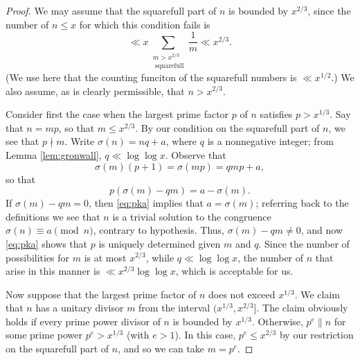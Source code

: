 \documentclass[12pt]{amsart}
\begin{document}
\begin{proof} We may assume that the squarefull part of $n$ is bounded by $x^{2/3}$, since the number of $n \leq x$ for which this condition fails is 
	\[ \ll x \sum_{\substack{m > x^{2/3}\\\text{ squarefull}}} \frac{1}{m} \ll x^{2/3}.\]
(We use here that the counting funciton of the squarefull numbers is $\ll x^{1/2}$.) We also assume, as is clearly permissible, that $n > x^{2/3}$. 
	
Consider first the case when the largest prime factor $p$ of $n$ satisfies $p > x^{1/3}$. Say that $n=mp$, so that $m \leq x^{2/3}$. By our condition on the squarefull part of $n$, we see that $p \nmid m$.  Write $\sigma(n) = nq+a$, where $q$ is a nonnegative integer; from Lemma \ref{lem:gronwall}, $q \ll \log\log{x}$. Observe that
\[ \sigma(m)(p+1) = \sigma(mp) = qmp+a, \]
so that
\begin{equation}\label{eq:pka} p(\sigma(m)-qm)=a-\sigma(m). \end{equation}
If $\sigma(m)-qm=0$, then \eqref{eq:pka} implies that $a=\sigma(m)$; referring back to the definitions we see that $n$ is a trivial solution to the congruence $\sigma(n)\equiv a\pmod{n}$, contrary to hypothesis. Thus, $\sigma(m)-qm  \neq 0$, and now \eqref{eq:pka} shows that $p$ is uniquely determined given $m$ and $q$. Since the number of possibilities for $m$ is at most $x^{2/3}$, while $q \ll \log\log{x}$, the number of $n$ that arise in this manner is $\ll x^{2/3}\log\log{x}$, which is acceptable for us.

Now suppose that the largest prime factor of $n$ does not exceed $x^{1/3}$. We claim that $n$ has a unitary divisor $m$ from the interval $(x^{1/3}, x^{2/3}]$. The claim obviously holds if every prime power divisor of $n$ is bounded by $x^{1/3}$. Otherwise, $p^e \parallel n$ for some prime power $p^e > x^{1/3}$ (with $e > 1$). In this case, $p^e \leq x^{2/3}$ by our restriction on the squarefull part of $n$, and so we can take $m=p^e$. 


\end{proof}
\end{document}
